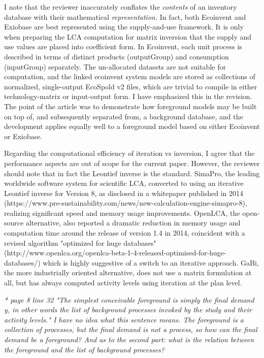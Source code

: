 \documentclass[11pt,letterpaper]{article}
\begin{document}
I note that the reviewer inaccurately conflates the \textit{contents} of an inventory database with their mathematical \textit{representation.}  In fact, both Ecoinvent and Exiobase are best represented using the supply-and-use framework.  It is only when preparing the LCA computation for matrix inversion that the supply and use values are placed into coefficient form.  In Ecoinvent, each unit process is described in terms of distinct products (outputGroup) and consumption (inputGroup) separately.  The un-allocated datasets are not suitable for computation, and the linked ecoinvent system models are stored as collections of normalized, single-output EcoSpold v2 files, which are trivial to compile in either technology-matrix or input-output form.  I have emphasized this in the revision.  The point of the article was to demonstrate how foreground models may be built on top of, and subsequently separated from, a background database, and the development applies equally well to a foreground model based on either Ecoinvent or Exiobase.  

Regarding the computational efficiency of iteration vs inversion, I agree that the performance aspects are out of scope for the current paper.  However, the reviewer should note that in fact the Leontief inverse is the standard.  SimaPro, the leading worldwide software system for scientific LCA, converted to using an iterative Leontief inverse for Version 8, as disclosed in a whitepaper published in 2014 (https://www.pre-sustainability.com/news/new-calculation-engine-simapro-8), realizing significant speed and memory usage improvements.  OpenLCA, the open-source alternative, also reported a dramatic reduction in memory usage and computation time around the release of version 1.4 in 2014, coincident with a revised algorithm "optimized for huge databases" (http://www.openlca.org/openlca-beta-1-4-released-optimised-for-huge-databases/) which is highly suggestive of a switch to an iterative approach.  GaBi, the more industrially oriented alternative, does not use a matrix formulation at all, but has always computed activity levels using iteration at the plan level.  

\emph{* page 8 line 32 "The simplest conceivable foreground is simply the final demand y, in other words the list of background processes invoked by the study and their activity levels." I have no idea what this sentence means. The foreground is a collection of processes, but the final demand is not a process, so how can the final demand be a foreground? And as to the second part: what is the relation between the foreground and the list of background processes?}
\end{document}

